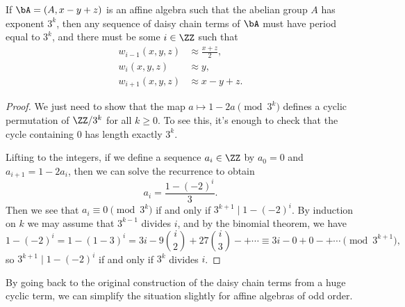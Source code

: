 \begin{prop} If $\bA = (A,x-y+z)$ is an affine algebra such that the abelian group $A$ has exponent $3^k$, then any sequence of daisy chain terms of $\bA$ must have period equal to $3^k$, and there must be some $i \in \ZZ$ such that
\begin{align*}
w_{i-1}(x,y,z) &\approx \frac{x+z}{2},\\
w_i(x,y,z) &\approx y,\\
w_{i+1}(x,y,z) &\approx x-y+z.
\end{align*}
\end{prop}
\begin{proof} We just need to show that the map $a \mapsto 1-2a \pmod{3^k}$ defines a cyclic permutation of $\ZZ/3^k$ for all $k \ge 0$. To see this, it's enough to check that the cycle containing $0$ has length exactly $3^k$.

Lifting to the integers, if we define a sequence $a_i \in \ZZ$ by $a_0 = 0$ and $a_{i+1} = 1-2a_i$, then we can solve the recurrence to obtain
\[
a_i = \frac{1 - (-2)^i}{3}.
\]
Then we see that $a_i \equiv 0 \pmod{3^k}$ if and only if $3^{k+1} \mid 1 - (-2)^i$. By induction on $k$ we may assume that $3^{k-1}$ divides $i$, and by the binomial theorem, we have
\[
1 - (-2)^i = 1 - (1-3)^i = 3i - 9\binom{i}{2} + 27\binom{i}{3} -+ \cdots \equiv 3i - 0 + 0 -+ \cdots \pmod{3^{k+1}},
\]
so $3^{k+1} \mid 1 - (-2)^i$ if and only if $3^k$ divides $i$.
\end{proof}

By going back to the original construction of the daisy chain terms from a huge cyclic term, we can simplify the situation slightly for affine algebras of odd order.

